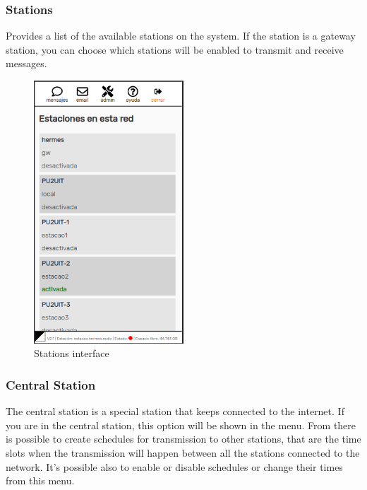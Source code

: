 \documentclass[11pt,a4paper]{article}
\begin{document}
\subsubsection{Stations} 
\label{gui_stations}

Provides a list of the available stations on the system. If the station is a gateway station, you can choose which stations will be enabled to transmit and receive messages.

\begin{figure}[H]
    \centering
    \includegraphics[width=0.5\textwidth]{screenshots/frontend/es/stations.png}
    \caption{Stations interface}
	\vspace{-10pt}
    \label{fig:stations}
\end{figure} 

\subsubsection{Central Station} 
\label{gui_central_station}

The central station is a special station that keeps connected to the internet. If you are in the central station, this option will be shown in the menu. From there is possible to create schedules for transmission to other stations, that are the time slots when the transmission will happen between all the stations connected to the network. It's possible also to enable or disable schedules or change their times from this menu.
\end{document}
